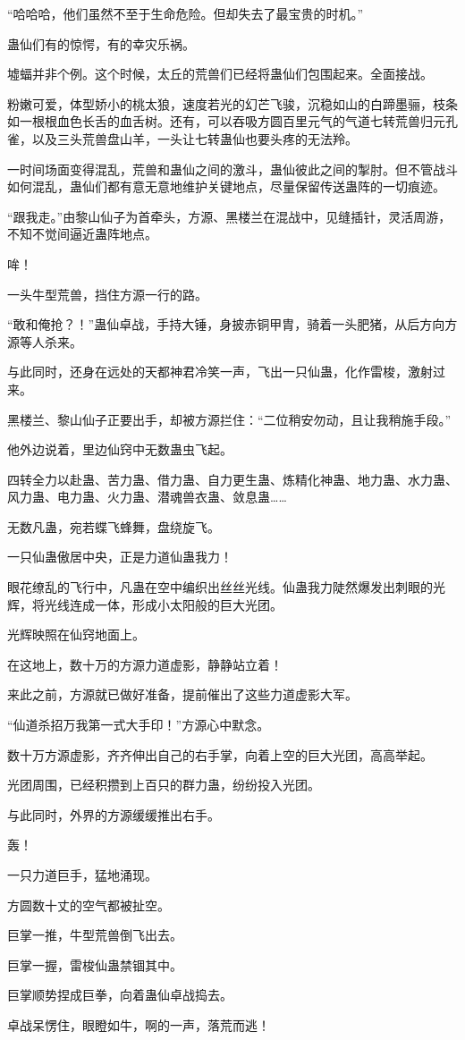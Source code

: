 \begin{this_body}
“哈哈哈，他们虽然不至于生命危险。但却失去了最宝贵的时机。”

蛊仙们有的惊愕，有的幸灾乐祸。

墟蝠并非个例。这个时候，太丘的荒兽们已经将蛊仙们包围起来。全面接战。

粉嫩可爱，体型娇小的桃太狼，速度若光的幻芒飞骏，沉稳如山的白蹄墨骊，枝条如一根根血色长舌的血舌树。还有，可以吞吸方圆百里元气的气道七转荒兽归元孔雀，以及三头荒兽盘山羊，一头让七转蛊仙也要头疼的无法羚。

一时间场面变得混乱，荒兽和蛊仙之间的激斗，蛊仙彼此之间的掣肘。但不管战斗如何混乱，蛊仙们都有意无意地维护关键地点，尽量保留传送蛊阵的一切痕迹。

“跟我走。”由黎山仙子为首牵头，方源、黑楼兰在混战中，见缝插针，灵活周游，不知不觉间逼近蛊阵地点。

哞！

一头牛型荒兽，挡住方源一行的路。

“敢和俺抢？！”蛊仙卓战，手持大锤，身披赤铜甲胄，骑着一头肥猪，从后方向方源等人杀来。

与此同时，还身在远处的天都神君冷笑一声，飞出一只仙蛊，化作雷梭，激射过来。

黑楼兰、黎山仙子正要出手，却被方源拦住：“二位稍安勿动，且让我稍施手段。”

他外边说着，里边仙窍中无数蛊虫飞起。

四转全力以赴蛊、苦力蛊、借力蛊、自力更生蛊、炼精化神蛊、地力蛊、水力蛊、风力蛊、电力蛊、火力蛊、潜魂兽衣蛊、敛息蛊……

无数凡蛊，宛若蝶飞蜂舞，盘绕旋飞。

一只仙蛊傲居中央，正是力道仙蛊我力！

眼花缭乱的飞行中，凡蛊在空中编织出丝丝光线。仙蛊我力陡然爆发出刺眼的光辉，将光线连成一体，形成小太阳般的巨大光团。

光辉映照在仙窍地面上。

在这地上，数十万的方源力道虚影，静静站立着！

来此之前，方源就已做好准备，提前催出了这些力道虚影大军。

“仙道杀招万我第一式大手印！”方源心中默念。

数十万方源虚影，齐齐伸出自己的右手掌，向着上空的巨大光团，高高举起。

光团周围，已经积攒到上百只的群力蛊，纷纷投入光团。

与此同时，外界的方源缓缓推出右手。

轰！

一只力道巨手，猛地涌现。

方圆数十丈的空气都被扯空。

巨掌一推，牛型荒兽倒飞出去。

巨掌一握，雷梭仙蛊禁锢其中。

巨掌顺势捏成巨拳，向着蛊仙卓战捣去。

卓战呆愣住，眼瞪如牛，啊的一声，落荒而逃！

\end{this_body}


